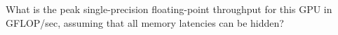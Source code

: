 \documentclass[a4paper,10pt]{article}
\begin{document}
\begin{enumerate}
{\begin{enumerate}
{            What is the peak single-precision floating-point throughput for this GPU in GFLOP/sec, assuming that all memory latencies can be hidden? 
        }
    \end{enumerate}
    
    }
    
\end{enumerate}
\end{document}
